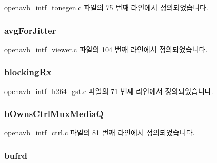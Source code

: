 openavb\+\_\+intf\+\_\+tonegen.\+c 파일의 75 번째 라인에서 정의되었습니다.

\subsubsection[{\texorpdfstring{avg\+For\+Jitter}{avgForJitter}}]{ avg\+For\+Jitter}\hypertarget{structpvt__data__t_a256c4974780653d8336adba501180157}{}\label{structpvt__data__t_a256c4974780653d8336adba501180157}


openavb\+\_\+intf\+\_\+viewer.\+c 파일의 104 번째 라인에서 정의되었습니다.

\subsubsection[{\texorpdfstring{blocking\+Rx}{blockingRx}}]{ blocking\+Rx}\hypertarget{structpvt__data__t_ac9f9861cdcfd729be77d74ec2dde36fe}{}\label{structpvt__data__t_ac9f9861cdcfd729be77d74ec2dde36fe}


openavb\+\_\+intf\+\_\+h264\+\_\+gst.\+c 파일의 71 번째 라인에서 정의되었습니다.

\subsubsection[{\texorpdfstring{b\+Owns\+Ctrl\+Mux\+MediaQ}{bOwnsCtrlMuxMediaQ}}]{ b\+Owns\+Ctrl\+Mux\+MediaQ}\hypertarget{structpvt__data__t_a0577d9d9a83d003c677892565339cd6e}{}\label{structpvt__data__t_a0577d9d9a83d003c677892565339cd6e}


openavb\+\_\+intf\+\_\+ctrl.\+c 파일의 81 번째 라인에서 정의되었습니다.

\subsubsection[{\texorpdfstring{bufrd}{bufrd}}]{ bufrd}\hypertarget{structpvt__data__t_acd45abda66e653e7f074a5409b9f5ab9}{}\label{structpvt__data__t_acd45abda66e653e7f074a5409b9f5ab9}


